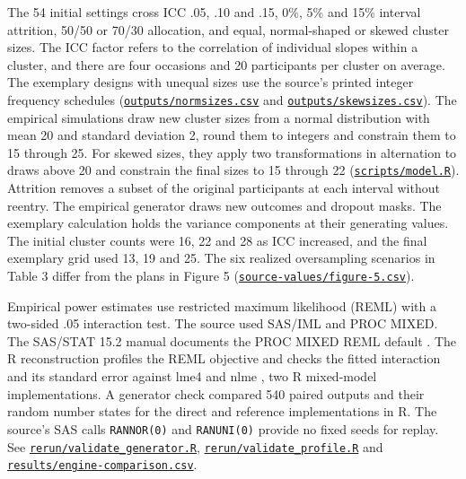 The 54 initial settings cross ICC .05, .10 and .15, 0\%, 5\% and 15\% interval attrition, 50/50 or 70/30 allocation, and equal, normal-shaped or skewed cluster sizes. The ICC factor refers to the correlation of individual slopes within a cluster, and there are four occasions and 20 participants per cluster on average. The exemplary designs with unequal sizes use the source's printed integer frequency schedules (\href{https://github.com/alectionary/vibe-math/blob/master/formalization/kupzyk-power-assumptions/outputs/normsizes.csv}{\nolinkurl{outputs/normsizes.csv}} and \href{https://github.com/alectionary/vibe-math/blob/master/formalization/kupzyk-power-assumptions/outputs/skewsizes.csv}{\nolinkurl{outputs/skewsizes.csv}}). The empirical simulations draw new cluster sizes from a normal distribution with mean 20 and standard deviation 2, round them to integers and constrain them to 15 through 25. For skewed sizes, they apply two transformations in alternation to draws above 20 and constrain the final sizes to 15 through 22 (\href{https://github.com/alectionary/vibe-math/blob/master/formalization/kupzyk-power-assumptions/scripts/model.R#L6-L20}{\nolinkurl{scripts/model.R}}). Attrition removes a subset of the original participants at each interval without reentry. The empirical generator draws new outcomes and dropout masks. The exemplary calculation holds the variance components at their generating values. The initial cluster counts were 16, 22 and 28 as ICC increased, and the final exemplary grid used 13, 19 and 25. The six realized oversampling scenarios in Table 3 differ from the plans in Figure 5 (\href{https://github.com/alectionary/vibe-math/blob/master/formalization/kupzyk-power-assumptions/source-values/figure-5.csv}{\nolinkurl{source-values/figure-5.csv}}).

Empirical power estimates use restricted maximum likelihood (REML) with a two-sided .05 interaction test. The source used SAS/IML and PROC MIXED. The SAS/STAT 15.2 manual documents the PROC MIXED REML default \citep[PROC MIXED statement, METHOD option]{sasmixed}. The R reconstruction profiles the REML objective and checks the fitted interaction and its standard error against lme4 \citep{bates2015} and nlme \citep{nlme2026}, two R mixed-model implementations. A generator check compared 540 paired outputs and their random number states for the direct and reference implementations in R. The source's SAS calls \texttt{RANNOR(0)} and \texttt{RANUNI(0)} provide no fixed seeds for replay. See \href{https://github.com/alectionary/vibe-math/blob/master/formalization/kupzyk-power-assumptions/rerun/validate_generator.R}{\nolinkurl{rerun/validate_generator.R}}, \href{https://github.com/alectionary/vibe-math/blob/master/formalization/kupzyk-power-assumptions/rerun/validate_profile.R}{\nolinkurl{rerun/validate_profile.R}} and \href{https://github.com/alectionary/vibe-math/blob/master/formalization/kupzyk-power-assumptions/results/engine-comparison.csv}{\nolinkurl{results/engine-comparison.csv}}.

